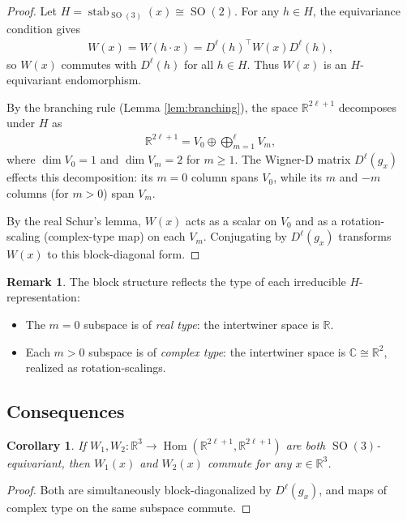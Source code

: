 \documentclass[a4paper, 12pt]{article}
\newcommand{\Hom}{\operatorname{Hom}}
\newcommand{\R}{\mathbb{R}}
\newcommand{\C}{\mathbb{C}}
\newcommand{\SO}{\operatorname{SO}(3)}
\newtheorem{corollary}[theorem]{Corollary}
\theoremstyle{definition}
\newtheorem{remark}[theorem]{Remark}
\begin{document}
\begin{proof}
Let $H = \operatorname{stab}_{\SO}(x) \cong \operatorname{SO}(2)$. For any $h \in H$, the equivariance condition gives
\begin{align*}
	W(x) = W(h \cdot x) = D^{\ell}(h)^{\top} W(x) D^{\ell}(h),
\end{align*}
so $W(x)$ commutes with $D^{\ell}(h)$ for all $h \in H$. Thus $W(x)$ is an $H$-equivariant endomorphism.

By the branching rule (Lemma \ref{lem:branching}), the space $\R^{2\ell+1}$ decomposes under $H$ as
\begin{align*}
	\R^{2\ell+1} = V_0 \oplus \bigoplus_{m=1}^{\ell} V_m,
\end{align*}
where $\dim V_0 = 1$ and $\dim V_m = 2$ for $m \geq 1$. The Wigner-D matrix $D^{\ell}(g_x)$ effects this decomposition: its $m = 0$ column spans $V_0$, while its $m$ and $-m$ columns (for $m > 0$) span $V_m$.

By the real Schur's lemma, $W(x)$ acts as a scalar on $V_0$ and as a rotation-scaling (complex-type map) on each $V_m$. Conjugating by $D^{\ell}(g_x)$ transforms $W(x)$ to this block-diagonal form.
\end{proof}

\begin{remark}
The block structure reflects the type of each irreducible $H$-representation:
\begin{itemize}
	\item The $m = 0$ subspace is of \emph{real type}: the intertwiner space is $\R$.
	\item Each $m > 0$ subspace is of \emph{complex type}: the intertwiner space is $\C \cong \R^2$, realized as rotation-scalings.
\end{itemize}
\end{remark}


\subsection{Consequences}

\begin{corollary}
If $W_1, W_2 : \mathbb{R}^3 \to \Hom(\mathbb{R}^{2\ell + 1}, \mathbb{R}^{2\ell + 1})$ are both $\SO$-equivariant, then $W_1(x)$ and $W_2(x)$ commute for any $x \in \mathbb{R}^3$.
\end{corollary}

\begin{proof}
Both are simultaneously block-diagonalized by $D^{\ell}(g_x)$, and maps of complex type on the same subspace commute.
\end{proof}
\end{document}
